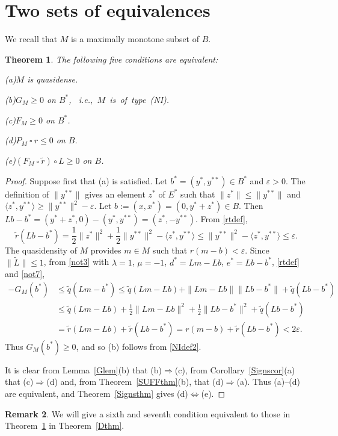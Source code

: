 \documentclass[letterpaper]{article}
\theoremstyle{plain}
\newtheorem{theorem}{Theorem}[section]
\theoremstyle{definition}
\newtheorem{remark}[theorem]{Remark}
\numberwithin{equation}{section}
\newcommand{\bra}[2]{\langle#1,#2\rangle}
\newcommand{\dbs}{^{**}}
\newcommand{\eps}{\varepsilon}
\newcommand{\half}{{\textstyle\frac{1}{2}}}
\newcommand{\lr}{\Longrightarrow}
\newcommand{\Lt}{{\wt L}}
\newcommand{\qt}{\wt q}
\newcommand{\rt}{\wt r}
\newcommand{\ssquare}{\ \square\ }
\newcommand{\wt}{\widetilde}
\newcommand{\Cor}{Corollary~\ref}
\newcommand{\Lem}{Lemma~\ref}
\newcommand{\Thm}{Theorem~\ref}
\begin{document}
\section{Two sets of equivalences}\label{EQUIVsec}
We recall that $M$ is a maximally monotone subset of $B$.
\begin{theorem}\label{EQUIVthm}
The following five conditions are equivalent:\par\noindent
{\rm(a)}\enspace $M$ is quasidense.\par\noindent
{\rm(b)}\enspace $G_M \ge 0$ on $B^*$, \hbox{\rm\ i.e.,  $M$ is of type (NI).}\par\noindent
{\rm(c)}\enspace $F_M \ge 0$ on $B^*$.\par\noindent
{\rm(d)}\enspace $P_M \ssquare r \le 0$ on $B$.\par\noindent
{\rm(e)}\enspace $(F_M \ssquare \rt) \circ L \ge 0$ on $B$.
\end{theorem}
\begin{proof}
Suppose first that (a) is satisfied.  Let $b^* = (y^*,y\dbs) \in B^*$ and $\eps > 0$.  The definition of $\|y\dbs\|$ gives an element $z^*$ of $E^*$ such that $\|z^*\| \le \|y\dbs\|$ and $\bra{z^*}{y\dbs} \ge \|y\dbs\|^2 - \eps$.   Let $b:= (x,x^*) = (0,y^* + z^*) \in B$.   Then $Lb - b^* = (y^* + z^*,0) - (y^*,y\dbs) = (z^*,-y\dbs)$.
%
From \eqref{rtdef},
%
$$\rt(Lb - b^*) = \half\|z^*\|^2 + \half\|y\dbs\|^2 - \bra{z^*}{y\dbs} \le \|y\dbs\|^2 - \bra{z^*}{y\dbs} \le \eps.$$
%
The quasidensity of $M$ provides $m \in M$ such that $r(m - b) < \eps$.  Since $\big\|\Lt\big\| \le 1$, from \eqref{not3} with $\lambda = 1$, $\mu = -1$,  $d^* = Lm - Lb$, $e^* = Lb - b^*$,  \eqref{rtdef} and \eqref{not7},
\begin{align*}
-G_M(b^*) &\le \qt(Lm - b^*) \le \qt(Lm - Lb) + \|Lm - Lb\|\|Lb - b^*\| + \qt(Lb - b^*)\\
 &\le \qt(Lm - Lb) + \half\|Lm - Lb\|^2 + \half\|Lb - b^*\|^2 + \qt(Lb - b^*)\\
 &= \rt(Lm - Lb) + \rt(Lb - b^*) = r(m - b) + \rt(Lb - b^*) < 2\eps.
\end{align*}
%
Thus $G_M(b^*) \ge 0$, and so (b) follows from \eqref{NIdef2}.

It is clear from  \Lem{Glem}(b) that (b)$\lr$(c), from \Cor{Signscor}(a) that (c)$\lr$(d) and, from \Thm{SUFFthm}(b), that (d)$\lr$(a).   Thus (a)--(d) are equivalent, and \Thm{Signsthm} gives (d)$\iff$(e).
\end{proof}
%
\begin{remark}
We will give a sixth and seventh condition equivalent to those in  \Thm{EQUIVthm} in \Thm{Dthm}.   
\end{remark}
\end{document}
